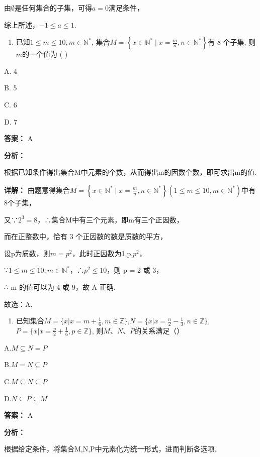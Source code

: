\documentclass[11pt,a4paper]{ctexart}
\begin{document}
由\(\emptyset\)是任何集合的子集，可得\(a = 0\)满足条件，

综上所述，\(-1 \leq a \leq 1\).

\begin{enumerate}[label=\arabic*., leftmargin=*, start=4]
\item 已知\(1 \leq m \leq 10, m \in \mathbb{N}^*\),
  集合\(M = \left\{x \in \mathbb{N}^* \mid x = \frac{m}{n}, n \in \mathbb{N}^*\right\}\)有
  8 个子集, 则\(m\)的一个值为 ( )
\end{enumerate}

A. 4

B. 5

C. 6

D. 7

\textbf{答案：}
A

\textbf{分析：}

根据已知条件得出集合M中元素的个数，从而得出m的因数个数，即可求出m的值.

\textbf{详解：}
由题意得集合\(M=\left\{x\in \mathbb{N}^{*}\mid x=\frac{m}{n},n\in \mathbb{N}^{*}\right\}(1\leq m\leq10,m\in \mathbb{N}^{*})\)中有8个子集，

又∵\(2^{3}=8\)，∴集合M中有三个元素，即m有三个正因数，

而在正整数中，恰有 3 个正因数的数是质数的平方，

设p为质数，则\(m=p^{2}\)，此时正因数为1,p,\(p^{2}\)，

∵\(1 \leq m \leq 10, m \in \mathbb{N}^{*}\)，∴\(p^{2} \leq 10\)，则 p = 2 或 3，

∴ m 的值可以为 4 或 9，故 A 正确.

故选：A.

\begin{enumerate}[label=\arabic*., leftmargin=*, start=5]
\item 已知集合\(M = \{x | x = m + \frac{1}{6}, m \in \mathbb{Z}\}\),\(N = \{x | x = \frac{n}{2} - \frac{1}{3}, n \in \mathbb{Z}\}\),\(P = \{x | x = \frac{p}{2} + \frac{1}{6}, p \in \mathbb{Z}\}\),
  则\(M\)、\(N\)、\(P\)的关系满足（）
\end{enumerate}

A.\(M \subseteq N = P\)

B.\(M = N \subseteq P\)

C.\(M \subseteq N \subseteq P\)

D.\(N \subseteq P \subseteq M\)

\textbf{答案：}
A

\textbf{分析：}

根据给定条件，将集合M,N,P中元素化为统一形式，进而判断各选项.
\end{document}
